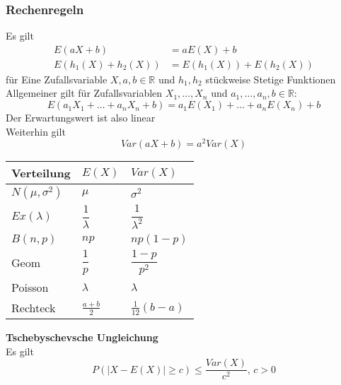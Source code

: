 \documentclass[
	ngerman,
	accentcolor=9c,%
	type=intern,
	marginpar=false
	]{tudapub}
\begin{document}
            \subsubsection{Rechenregeln}
                Es gilt
                \begin{align*}
                    E(aX + b) &= aE(X)+ b\\
                    E(h_1(X)+h_2(X)) &= E(h_1(X))+E(h_2(X))
                \end{align*}
                für Eine Zufallsvariable $X, a, b \in \mathbb{R}$ und $h_1, h_2$ stückweise Stetige Funktionen\\
                Allgemeiner gilt für Zufallsvariablen $X_1,\dots, X_n$ und $a_1, \dots, a_n, b \in \mathbb{R}$:
                \begin{equation*}
                    E(a_1X_1 + \dots + a_nX_n + b) = a_1E(X_1)+\dots+a_nE(X_n) + b
                \end{equation*} 
                Der Erwartungswert ist also linear\\
                Weiterhin gilt
                \begin{equation*}
                    Var(aX + b) = a^2 Var(X)
                \end{equation*}
                \begin{center}
                    \begin{tabular}{l l l}
                        \hline
                        Verteilung & $E(X)$ & $Var(X)$\\
                        \hline
                        $N(\mu, \sigma^2)$ & $\mu$ & $\sigma^2$\\
                        $Ex(\lambda)$ & $\dfrac{1}{\lambda}$ & $\dfrac{1}{\lambda^2}$\\
                        $B(n,p)$ & $np$ & $np(1-p)$\\
                        Geom & $\dfrac{1}{p}$& $\dfrac{1-p}{p^2}$\\
                        Poisson & $\lambda$ & $\lambda$\\
                        Rechteck & $\frac{a+b}{2}$ & $\frac{1}{12}(b-a)$\\
                        \hline
                    \end{tabular}
                \end{center}
                \textbf{Tschebyschevsche Ungleichung}\\
                Es gilt
                \begin{equation*}
                    P(|X-E(X)| \geq c) \leq \dfrac{Var(X)}{c^2}\mbox{, } c>0
                \end{equation*}
\end{document}

